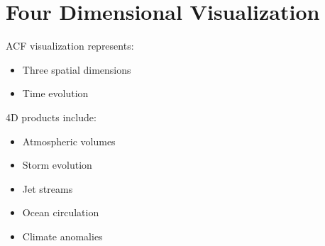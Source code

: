 \section{Four Dimensional Visualization}


ACF visualization represents:


\begin{itemize}

\item Three spatial dimensions

\item Time evolution

\end{itemize}



4D products include:


\begin{itemize}

\item Atmospheric volumes

\item Storm evolution

\item Jet streams

\item Ocean circulation

\item Climate anomalies

\end{itemize}

